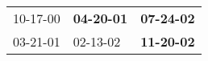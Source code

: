 \begin{supertabular}{p{0.33\columnwidth}p{0.33\columnwidth}p{0.33\columnwidth}}
 10-17-00\textsuperscript{} &  \textbf{04-20-01\textsuperscript{}} &  \textbf{07-24-02\textsuperscript{}} \\
 03-21-01\textsuperscript{} &           02-13-02\textsuperscript{} &  \textbf{11-20-02\textsuperscript{}} \\
\end{supertabular}
